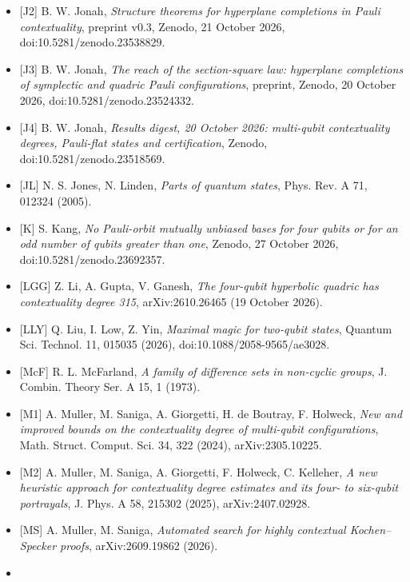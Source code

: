 \documentclass[11pt,a4paper]{article}
\begin{document}
\begin{itemize}
  {[}J1{]} B. W. Jonah, \emph{A section--square law for Pauli quadrics, and an independently regenerated proof that the four-qubit elliptic quadric has contextuality degree 315}, preprint, Zenodo, 20 October 2026, doi:10.5281/zenodo.23510634.
\item
  {[}J2{]} B. W. Jonah, \emph{Structure theorems for hyperplane completions in Pauli contextuality}, preprint v0.3, Zenodo, 21 October 2026, doi:10.5281/zenodo.23538829.
\item
  {[}J3{]} B. W. Jonah, \emph{The reach of the section-square law: hyperplane completions of symplectic and quadric Pauli configurations}, preprint, Zenodo, 20 October 2026, doi:10.5281/zenodo.23524332.
\item
  {[}J4{]} B. W. Jonah, \emph{Results digest, 20 October 2026: multi-qubit contextuality degrees, Pauli-flat states and certification}, Zenodo, doi:10.5281/zenodo.23518569.
\item
  {[}JL{]} N. S. Jones, N. Linden, \emph{Parts of quantum states}, Phys. Rev. A 71, 012324 (2005).
\item
  {[}K{]} S. Kang, \emph{No Pauli-orbit mutually unbiased bases for four qubits or for an odd number of qubits greater than one}, Zenodo, 27 October 2026, doi:10.5281/zenodo.23692357.
\item
  {[}LGG{]} Z. Li, A. Gupta, V. Ganesh, \emph{The four-qubit hyperbolic quadric has contextuality degree 315}, arXiv:2610.26465 (19 October 2026).
\item
  {[}LLY{]} Q. Liu, I. Low, Z. Yin, \emph{Maximal magic for two-qubit states}, Quantum Sci. Technol. 11, 015035 (2026), doi:10.1088/2058-9565/ae3028.
\item
  {[}McF{]} R. L. McFarland, \emph{A family of difference sets in non-cyclic groups}, J. Combin. Theory Ser. A 15, 1 (1973).
\item
  {[}M1{]} A. Muller, M. Saniga, A. Giorgetti, H. de Boutray, F. Holweck, \emph{New and improved bounds on the contextuality degree of multi-qubit configurations}, Math. Struct. Comput. Sci. 34, 322 (2024), arXiv:2305.10225.
\item
  {[}M2{]} A. Muller, M. Saniga, A. Giorgetti, F. Holweck, C. Kelleher, \emph{A new heuristic approach for contextuality degree estimates and its four- to six-qubit portrayals}, J. Phys. A 58, 215302 (2025), arXiv:2407.02928.
\item
  {[}MS{]} A. Muller, M. Saniga, \emph{Automated search for highly contextual Kochen--Specker proofs}, arXiv:2609.19862 (2026).
\item

\end{itemize}
\end{document}
